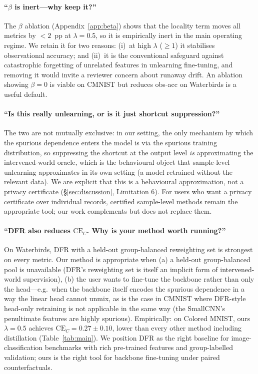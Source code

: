 \documentclass{article}
\newcommand{\CE}{\mathrm{CE}}
\begin{document}
\paragraph{``$\beta$ is inert---why keep it?''}
The $\beta$ ablation (Appendix~\ref{app:beta}) shows that the locality term
moves all metrics by $<2$~pp at $\lambda{=}0.5$, so it is empirically inert
in the main operating regime.  We retain it for two reasons:
(i)~at high $\lambda$ ($\geq 1$) it stabilises observational accuracy; and
(ii)~it is the conventional safeguard against catastrophic forgetting of
unrelated features in unlearning fine-tuning, and removing it would invite
a reviewer concern about runaway drift.  An ablation showing $\beta=0$ is
viable on CMNIST but reduces obs-acc on Waterbirds is a useful default.

\paragraph{``Is this really unlearning, or is it just shortcut suppression?''}
The two are not mutually exclusive: in our setting, the only mechanism by
which the spurious dependence enters the model is via the spurious
training distribution, so suppressing the shortcut at the output level
\emph{is} approximating the intervened-world oracle, which is the
behavioural object that sample-level unlearning approximates in its own
setting (a model retrained without the relevant data).  We are explicit
that this is a behavioural approximation, not a privacy certificate
(\S\ref{sec:discussion}, Limitation 6).  For users who want a privacy
certificate over individual records, certified sample-level methods
\cite{guo2020certified,sekhari2021remember} remain the appropriate tool;
our work complements but does not replace them.

\paragraph{``DFR also reduces $\CE_C$. Why is your method worth running?''}
On Waterbirds, DFR with a held-out group-balanced reweighting set is
strongest on every metric.  Our method is appropriate when (a) a held-out
group-balanced pool is unavailable (DFR's reweighting set is itself an
implicit form of intervened-world supervision), (b) the user wants to
fine-tune the backbone rather than only the head---e.g.\ when the backbone
itself encodes the spurious dependence in a way the linear head cannot
unmix, as is the case in CMNIST where DFR-style head-only retraining is not
applicable in the same way (the SmallCNN's penultimate features are highly
spurious).  Empirically: on Colored MNIST, ours $\lambda{=}0.5$ achieves
$\CE_C{=}0.27 \pm 0.10$, lower than every other method including
distillation (Table~\ref{tab:main}).  We position DFR as the right baseline
for image-classification benchmarks with rich pre-trained features and
group-labelled validation; ours is the right tool for backbone fine-tuning
under paired counterfactuals.
\end{document}
